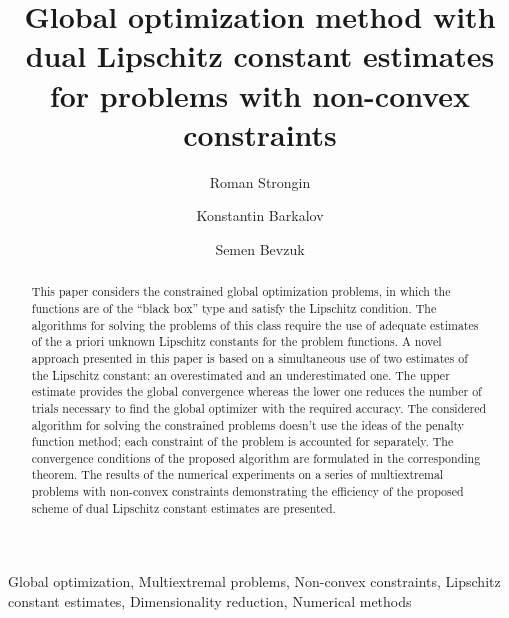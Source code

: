 \documentclass[preprint]{elsarticle}
\begin{document}
\begin{frontmatter}

\title{Global optimization method with dual Lipschitz constant estimates for problems with non-convex constraints}

\author{Roman Strongin}
\author{Konstantin Barkalov}
\author{Semen Bevzuk}
\address{Lobachevsky State University of Nizhni Novgorod, Nizhni Novgorod, Russia}

\begin{abstract}
This paper considers the constrained global optimization problems, in which the functions are of the “black box” type and satisfy the Lipschitz condition. The algorithms for solving the problems of this class require the use of adequate estimates of the a priori unknown Lipschitz constants for the problem functions. A novel approach presented in this paper is based on a simultaneous use of two estimates of the Lipschitz constant: an overestimated and an underestimated one. The upper estimate provides the global convergence whereas the lower one reduces the number of trials necessary to find the global optimizer with the required accuracy. The considered algorithm for solving the constrained problems doesn’t use the ideas of the penalty function method; each constraint of the problem is accounted for separately. The convergence conditions of the proposed algorithm are formulated in the corresponding theorem. The results of the numerical experiments on a series of multiextremal problems with non-convex constraints demonstrating the efficiency of the proposed scheme of dual Lipschitz constant estimates are presented.
\end{abstract}

\begin{keyword}
Global optimization, Multiextremal problems, Non-convex constraints, Lipschitz constant estimates, Dimensionality reduction, Numerical methods
\end{keyword}

\end{frontmatter}

\linenumbers
\end{document}
